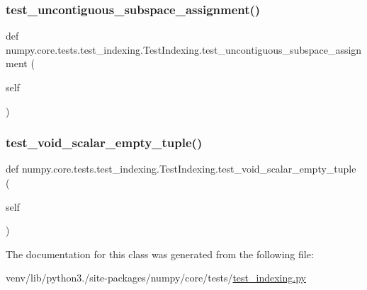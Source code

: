 \subsubsection{\texorpdfstring{test\+\_\+uncontiguous\+\_\+subspace\+\_\+assignment()}{test\_uncontiguous\_subspace\_assignment()}}
{\footnotesize\ttfamily def numpy.\+core.\+tests.\+test\+\_\+indexing.\+Test\+Indexing.\+test\+\_\+uncontiguous\+\_\+subspace\+\_\+assignment (\begin{DoxyParamCaption}\item[{}]{self }\end{DoxyParamCaption})}

\mbox{\label{classnumpy_1_1core_1_1tests_1_1test__indexing_1_1TestIndexing_ad01dc01b91c177e5cd6332b4da33b6ce}} 
\subsubsection{\texorpdfstring{test\+\_\+void\+\_\+scalar\+\_\+empty\+\_\+tuple()}{test\_void\_scalar\_empty\_tuple()}}
{\footnotesize\ttfamily def numpy.\+core.\+tests.\+test\+\_\+indexing.\+Test\+Indexing.\+test\+\_\+void\+\_\+scalar\+\_\+empty\+\_\+tuple (\begin{DoxyParamCaption}\item[{}]{self }\end{DoxyParamCaption})}



The documentation for this class was generated from the following file\+:\begin{DoxyCompactItemize}
\item 
venv/lib/python3./site-\/packages/numpy/core/tests/\hyperlink{test__indexing_8py}{test\+\_\+indexing.\+py}\end{DoxyCompactItemize}
